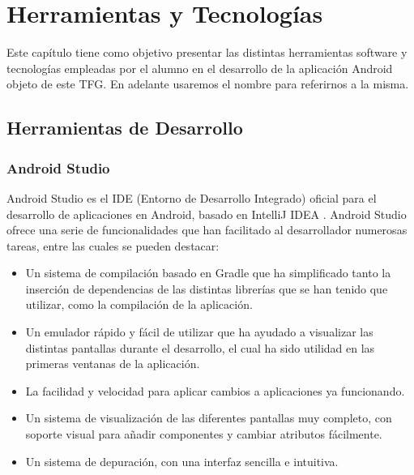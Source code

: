 %
% 
%


\cleardoublepage
\chapter{Herramientas y Tecnologías} \label{chap:Tecnologias} 

Este capítulo tiene como objetivo presentar las distintas herramientas software y tecnologías empleadas por el alumno en el desarrollo de la aplicación Android 
objeto de este TFG. En adelante usaremos el nombre \ULLAR{} para referirnos a la misma.

\section{Herramientas de Desarrollo}

\subsection{Android Studio}

Android Studio \cite{URL::AndroidStudio} es el IDE  \cite{URL::IDE} (Entorno de Desarrollo Integrado) oficial para el desarrollo de aplicaciones en Android, basado en IntelliJ IDEA \cite{URL::IntelliJIDEA}. Android Studio ofrece una serie de funcionalidades que han facilitado al desarrollador numerosas tareas, entre las cuales se pueden destacar:

\begin{itemize}
\item Un sistema de compilación basado en Gradle \cite{URL::Gradle} que ha simplificado tanto la inserción de dependencias de las distintas librerías que se han tenido que utilizar, como la compilación de la aplicación.
\item Un emulador rápido y fácil de utilizar que ha ayudado a visualizar las distintas pantallas durante el desarrollo, el cual ha sido utilidad en las primeras ventanas de la aplicación.
\item La facilidad y velocidad para aplicar cambios a aplicaciones ya funcionando. 
\item Un sistema de visualización de las diferentes pantallas muy completo, con soporte visual para añadir componentes y cambiar atributos fácilmente.
\item Un sistema de depuración, con una interfaz sencilla e intuitiva.
\end{itemize} 

